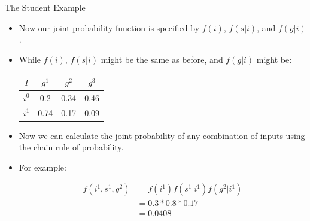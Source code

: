 \documentclass[handout]{beamer}
\begin{document}
\begin{frame}{The Student Example}
\scriptsize{
\begin{itemize}

\item Now our joint probability function  is specified by $f(i)$, $f(s|i)$, and $f(g|i)$.

\item While  $f(i)$, $f(s|i)$ might be the same as before, and  $f(g|i)$ might be:


\begin{table}
\centering
  \begin{tabular}{c||ccc} \hline
$I$ & $g^1$ & $g^2$ & $g^3$  \\ \hline
$i^0$ & 0.2 & 0.34 & 0.46 \\
$i^1$ & 0.74 & 0.17 & 0.09 \\

\end{tabular} 
\end{table}

\item Now we can calculate the joint probability of any combination of inputs using the chain rule of probability.

\item For example: 

 \begin{align}
  f(i^1,s^1,g^2) & = f(i^1)f(s^1|i^1)f(g^2|i^1) \\
   & = 0.3*0.8*0.17 \\
   & = 0.0408
 \end{align}

\end{itemize}



} 

\end{frame}
\end{document}
